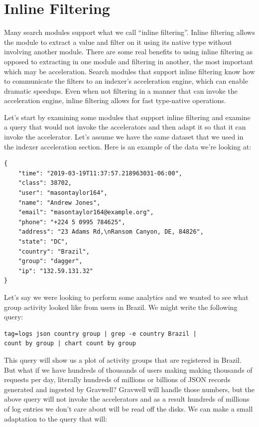 \section{Inline Filtering}

Many search modules support what we call ``inline filtering''. Inline
filtering allows the module to extract a value and filter on it using
its native type without involving another module. There are some real
benefits to using inline filtering as opposed to extracting in one
module and filtering in another, the most important which may be
acceleration. Search modules that support inline filtering know how to
communicate the filters to an indexer's acceleration engine, which can
enable dramatic speedups. Even when not filtering in a manner that can
invoke the acceleration engine, inline filtering allows for fast type-native operations.

Let's start by examining some modules that support inline filtering and
examine a query that would not invoke the accelerators and then adapt it
so that it can invoke the accelerator. Let's assume we have the same
dataset that we used in the indexer acceleration section. Here is an
example of the data we're looking at:

\begin{Verbatim}[breaklines=true]
{
    "time": "2019-03-19T11:37:57.218963031-06:00",
    "class": 38702,
    "user": "masontaylor164",
    "name": "Andrew Jones",
    "email": "masontaylor164@example.org",
    "phone": "+224 5 0995 784625",
    "address": "23 Adams Rd,\nRansom Canyon, DE, 84826",
    "state": "DC",
    "country": "Brazil",
    "group": "dagger",
    "ip": "132.59.131.32"
}
\end{Verbatim}

Let's say we were looking to perform some analytics and we wanted to see
what group activity looked like from users in Brazil. We might write the
following query:

\begin{Verbatim}[breaklines=true]
tag=logs json country group | grep -e country Brazil |
count by group | chart count by group
\end{Verbatim}

This query will show us a plot of activity groups that are registered
in Brazil. But what if we
have hundreds of thousands of users making making thousands of requests
per day, literally hundreds of millions or billions of JSON records
generated and ingested by Gravwell? Gravwell will handle those numbers,
but the above query will not invoke the accelerators and as a result
hundreds of millions of log entries we don't care about will be read off the disks.
We can make a small adaptation to the query that will:

